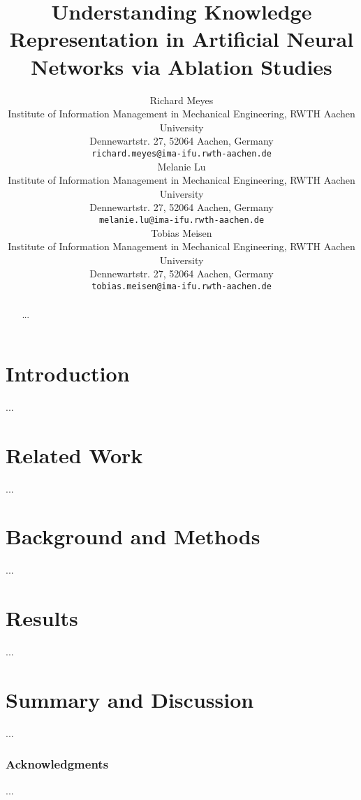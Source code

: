 \documentclass{article}
\title{Understanding Knowledge Representation in Artificial Neural Networks via Ablation Studies}
\author{
  Richard Meyes \\
  Institute of Information Management in Mechanical Engineering, RWTH Aachen University \\
  Dennewartstr. 27, 52064 Aachen, Germany \\
  \texttt{richard.meyes@ima-ifu.rwth-aachen.de} \\
  \And
  Melanie Lu \\
  Institute of Information Management in Mechanical Engineering, RWTH Aachen University \\
  Dennewartstr. 27, 52064 Aachen, Germany \\
  \texttt{melanie.lu@ima-ifu.rwth-aachen.de} \\
  \AND
  Tobias Meisen \\
  Institute of Information Management in Mechanical Engineering, RWTH Aachen University \\
  Dennewartstr. 27, 52064 Aachen, Germany \\
  \texttt{tobias.meisen@ima-ifu.rwth-aachen.de} \\
}
\begin{document}

\maketitle

\begin{abstract}
...
\end{abstract}

\section{Introduction}
...

\section{Related Work}
...

\section{Background and Methods}
...

\section{Results}
...

\section{Summary and Discussion}
...

\subsubsection*{Acknowledgments}
...

\small


\end{document}
